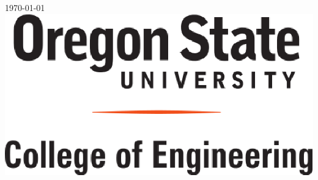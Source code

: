 \documentclass[letterpaper,11pt,notitlepage,fleqn]{article}
\begin{document}
\begin{titlepage}

{\large \today}\\[3cm] %


    \includegraphics[scale=0.5]{coe.eps}\\[1cm] %


\vfill %



\end{titlepage}

\tableofcontents
\newpage
\end{document}
